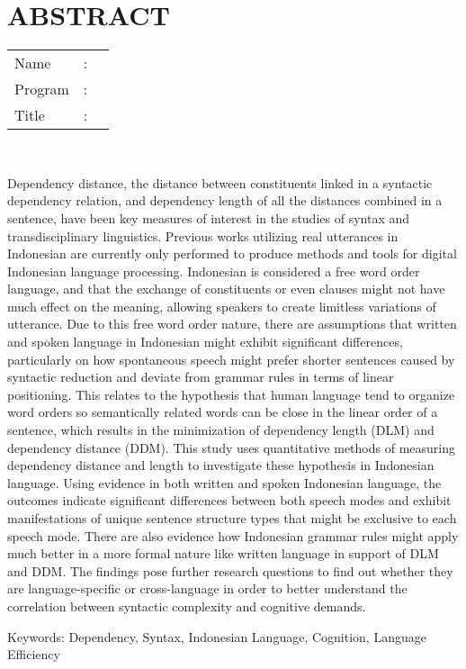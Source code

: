 %
%
%

\chapter*{ABSTRACT}

\vspace*{0.2cm}

\noindent \begin{tabular}{l l p{11.0cm}}
	Name&: & \penulis \\
	Program&: & \programinggris \\
	Title&: & \judulInggris \\
\end{tabular} \\ 

\vspace*{1cm}

Dependency distance, the distance between constituents linked in a syntactic dependency relation, and dependency length of all the distances combined in a sentence, have been key measures of interest in the studies of syntax and transdisciplinary linguistics. Previous works utilizing real utterances in Indonesian are currently only performed to produce methods and tools for digital Indonesian language processing. Indonesian is considered a free word order language, and that the exchange of constituents or even clauses might not have much effect on the meaning, allowing speakers to create limitless variations of utterance. Due to this free word order nature, there are assumptions that written and spoken language in Indonesian might exhibit significant differences, particularly on how spontaneous speech might prefer shorter sentences caused by syntactic reduction and deviate from grammar rules in terms of linear positioning. This relates to the hypothesis that human language tend to organize word orders so semantically related words can be close in the linear order of a sentence, which results in the minimization of dependency length (DLM) and dependency distance (DDM). This study uses quantitative methods of measuring dependency distance and length to investigate these hypothesis in Indonesian language. Using evidence in both written and spoken Indonesian language, the outcomes indicate significant differences between both speech modes and exhibit manifestations of unique sentence structure types that might be exclusive to each speech mode. There are also evidence how Indonesian grammar rules might apply much better in a more formal nature like written language in support of DLM and DDM. The findings pose further research questions to find out whether they are language-specific or cross-language in order to better understand the correlation between syntactic complexity and cognitive demands.

\vspace*{0.5cm}

\noindent Keywords: 
\newline
\noindent Dependency, Syntax, Indonesian Language, Cognition, Language Efficiency

\newpage